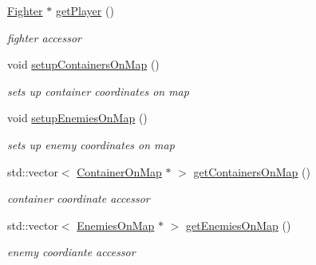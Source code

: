 \begin{DoxyCompactItemize}
\hypertarget{class_pre_built_level_ab00f1496cbd95f85dd9471539a7525a9}{}\label{class_pre_built_level_ab00f1496cbd95f85dd9471539a7525a9} 
\hyperlink{class_fighter}{Fighter} $\ast$ \hyperlink{class_pre_built_level_ab00f1496cbd95f85dd9471539a7525a9}{get\+Player} ()
\begin{DoxyCompactList}\small\item\em fighter accessor \end{DoxyCompactList}\item 
\hypertarget{class_pre_built_level_ae49e0ab74872be75e2546610607d5868}{}\label{class_pre_built_level_ae49e0ab74872be75e2546610607d5868} 
void \hyperlink{class_pre_built_level_ae49e0ab74872be75e2546610607d5868}{setup\+Containers\+On\+Map} ()
\begin{DoxyCompactList}\small\item\em sets up container coordinates on map \end{DoxyCompactList}\item 
\hypertarget{class_pre_built_level_a53bd1cda4f32c5da41e1c21295ef4861}{}\label{class_pre_built_level_a53bd1cda4f32c5da41e1c21295ef4861} 
void \hyperlink{class_pre_built_level_a53bd1cda4f32c5da41e1c21295ef4861}{setup\+Enemies\+On\+Map} ()
\begin{DoxyCompactList}\small\item\em sets up enemy coordinates on map \end{DoxyCompactList}\item 
\hypertarget{class_pre_built_level_a0089fb9d42b5ee32e395b7b7c4fd3576}{}\label{class_pre_built_level_a0089fb9d42b5ee32e395b7b7c4fd3576} 
std\+::vector$<$ \hyperlink{struct_container_on_map}{Container\+On\+Map} $\ast$ $>$ \hyperlink{class_pre_built_level_a0089fb9d42b5ee32e395b7b7c4fd3576}{get\+Containers\+On\+Map} ()
\begin{DoxyCompactList}\small\item\em container coordinate accessor \end{DoxyCompactList}\item 
\hypertarget{class_pre_built_level_a12a3cd62a8b7913e674befc2af8f41dc}{}\label{class_pre_built_level_a12a3cd62a8b7913e674befc2af8f41dc} 
std\+::vector$<$ \hyperlink{struct_enemies_on_map}{Enemies\+On\+Map} $\ast$ $>$ \hyperlink{class_pre_built_level_a12a3cd62a8b7913e674befc2af8f41dc}{get\+Enemies\+On\+Map} ()
\begin{DoxyCompactList}\small\item\em enemy coordiante accessor \end{DoxyCompactList}\item 

\end{DoxyCompactItemize}
